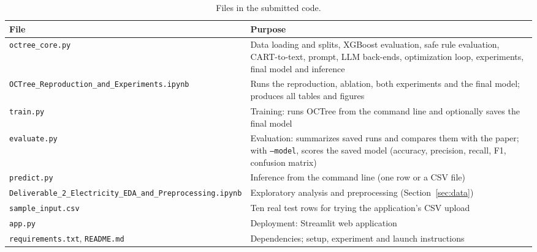 \documentclass[11pt]{article}
\newcommand{\code}[1]{\texttt{#1}}
\begin{document}
\begin{table}[H]
\centering
\caption{Files in the submitted code.}
\label{tab:files}
\begin{tabularx}{\linewidth}{@{}lY@{}}
\toprule
File & Purpose \\
\midrule
\code{octree\_core.py} & Data loading and splits, XGBoost evaluation, safe rule evaluation, CART-to-text, prompt, LLM back-ends, optimization loop, experiments, final model and inference \\
\code{OCTree\_Reproduction\_and\_Experiments.ipynb} & Runs the reproduction, ablation, both experiments and the final model; produces all tables and figures \\
\code{train.py} & Training: runs OCTree from the command line and optionally saves the final model \\
\code{evaluate.py} & Evaluation: summarizes saved runs and compares them with the paper; with \code{--model}, scores the saved model (accuracy, precision, recall, F1, confusion matrix) \\
\code{predict.py} & Inference from the command line (one row or a CSV file) \\
\code{Deliverable\_2\_Electricity\_EDA\_and\_Preprocessing.ipynb} & Exploratory analysis and preprocessing (Section~\ref{sec:data}) \\
\code{sample\_input.csv} & Ten real test rows for trying the application's CSV upload \\
\code{app.py} & Deployment: Streamlit web application \\
\code{requirements.txt}, \code{README.md} & Dependencies; setup, experiment and launch instructions \\
\bottomrule
\end{tabularx}
\end{table}
\end{document}
